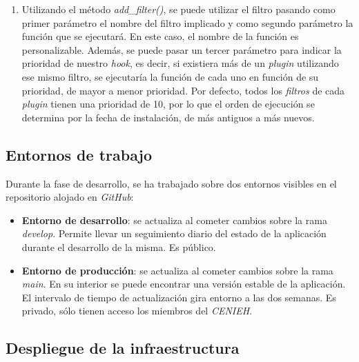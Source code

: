
\begin{enumerate}
\def\labelenumi{\arabic{enumi}.}
\setcounter{enumi}{1}
\tightlist
\item
  Utilizando el método \emph{add\_filter()}, se puede utilizar el filtro
  pasando como primer parámetro el nombre del filtro implicado y como
  segundo parámetro la función que se ejecutará. En este caso, el nombre
  de la función es personalizable. Además, se puede pasar un tercer
  parámetro para indicar la prioridad de nuestro \emph{hook}, es decir,
  si existiera más de un \emph{plugin} utilizando ese mismo filtro, se
  ejecutaría la función de cada uno en función de su prioridad, de mayor
  a menor prioridad. Por defecto, todos los \emph{filtros} de cada
  \emph{plugin} tienen una prioridad de 10, por lo que el orden de
  ejecución se determina por la fecha de instalación, de más antiguos a
  más nuevos.
\end{enumerate}


\subsection{Entornos de trabajo}

Durante la fase de desarrollo, se ha trabajado sobre dos entornos visibles 
en el repositorio alojado en \emph{GitHub}:

\begin{itemize}
\tightlist
\item
  \textbf{Entorno de desarrollo}: se actualiza al cometer cambios sobre
  la rama \emph{develop}. Permite llevar un seguimiento diario del
  estado de la aplicación durante el desarrollo de la misma. Es público.
\item
  \textbf{Entorno de producción}: se actualiza al cometer cambios sobre
  la rama \emph{main}. En su interior se puede encontrar una versión
  estable de la aplicación. El intervalo de tiempo de actualización gira
  entorno a las dos semanas. Es privado, sólo tienen acceso los miembros
  del \emph{CENIEH}.
\end{itemize}

\subsection{Despliegue de la infraestructura}

